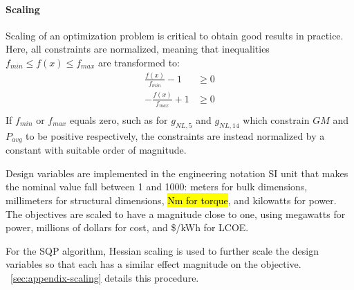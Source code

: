 \paragraph{Scaling}
Scaling of an optimization problem is critical to obtain good results in practice. Here, all constraints are normalized, meaning that inequalities $f_{min} \leq f(x) \leq f_{max}$ are transformed to:
\begin{equation}
\begin{aligned}
    \frac{f(x)}{f_{min}}-1 &\geq 0 \\
    -\frac{f(x)}{f_{max}}+1 &\geq 0 \\
\end{aligned}
\end{equation}
If $f_{min}$ or $f_{max}$ equals zero, such as for $g_{NL,5}$ and $g_{NL,14}$ which constrain $GM$ and $P_{avg}$ to be positive respectively, the constraints are instead normalized by a constant with suitable order of magnitude.

Design variables are implemented in the engineering notation SI unit that makes the nominal value fall between 1 and 1000: meters for bulk dimensions, millimeters for structural dimensions, \hl{Nm for torque}, and kilowatts for power. The objectives are scaled to have a magnitude close to one, using megawatts for power, millions of dollars for cost, and \$/kWh for LCOE.

For the SQP algorithm, Hessian scaling is used to further scale the design variables so that each has a similar effect magnitude on the objective. \appendixname~\ref{sec:appendix-scaling} details this procedure. 

